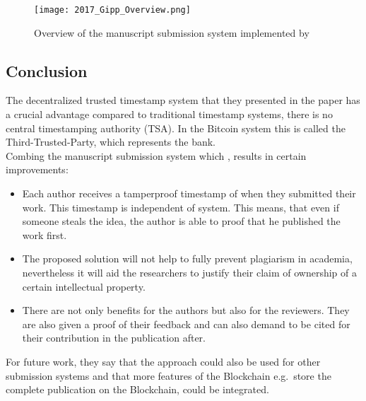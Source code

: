 \begin{figure}[!ht]
    \centering
    \texttt{[image: 2017\_Gipp\_Overview.png]}
    \label{fig:2017_gipp_overview}
    \caption{Overview of the manuscript submission system implemented by \citet{2017_Gipp}}
\end{figure}


\subsection*{Conclusion}
The decentralized trusted timestamp system  that they presented in the paper has a crucial advantage compared to traditional timestamp systems, there is no central timestamping authority (TSA). In the Bitcoin system this is called the Third-Trusted-Party, which represents the bank.\\
Combing the manuscript submission system which , results in certain improvements:
\begin{itemize}
	\item Each author receives a tamperproof timestamp of when they submitted their work. This timestamp is independent of  system. This means, that even if someone steals the idea, the author is able to proof that he published the work first.
	\item The proposed solution will not help to fully prevent plagiarism in academia, nevertheless it will aid the researchers to justify their claim of ownership of a certain intellectual property.
	\item There are not only benefits for the authors but also for the reviewers. They are also given a proof of their feedback and can also demand to be cited for their contribution in the publication after.
\end{itemize}
For future work, they say that the approach could also be used for other submission systems and that more features of the Blockchain e.g.\ store the complete publication on the Blockchain, could be integrated.\\
